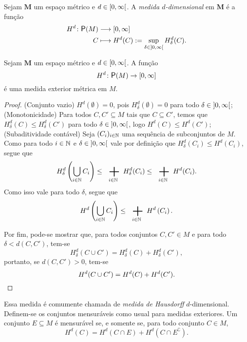 \begin{definition}
Sejam $\bm M$ um espaço métrico e $d \in \left[{0},{\infty}\right[$. A \emph{medida $d$-dimensional} em $\bm M$ é a função
 	\begin{align*}
 	\func{H^d}{\p(M)}{\intff{0}{\infty}}{C}{H^d(C) := \sup_{\delta \in \intaa{0}{\infty}} H^d_\delta(C).}
 	\end{align*}
\end{definition}

\begin{proposition}
Sejam $\bm M$ um espaço métrico e $d \in \left[{0},{\infty}\right[$. A função
	\begin{equation*}
	H^d\colon \p(M) \to \intff{0}{\infty}
	\end{equation*}
é uma medida exterior métrica em $M$.
\end{proposition}
\begin{proof}
(Conjunto vazio) $H^d(\emptyset)=0$, pois $H^d_\delta(\emptyset)=0$ para todo $\delta \in \left]{0},{\infty}\right[$; (Monotonicidade) Para todos $C,C' \subseteq M$ tais que $C \subseteq C'$, temos que $H^d_\delta(C) \leq H^d_\delta(C')$ para todo $\delta \in \left]{0},{\infty}\right[$, logo $H^d(C) \leq H^d(C')$; (Subaditividade contável) Seja $(C_i)_{i \in \mathbb{N}}$ uma sequência de subconjuntos de $M$. Como para todo $i \in \mathbb{N}$ e $\delta \in \left]{0},{\infty}\right[$ vale por definição que $H^d_\delta(C_i) \leq H^d(C_i)$, segue que
	\begin{equation*}
	H^d_\delta\left( \bigcup_{i \in \N} C_i \right) \leq \sum_{i \in \N} H^d_\delta(C_i) \leq  \sum_{i \in \N} H^d(C_i).
	\end{equation*}
Como isso vale para todo $\delta$, segue que
	\begin{equation*}
	H^d\left( \bigcup_{i \in \N} C_i \right) \leq \sum_{i \in \N} H^d\left( C_i \right).
	\end{equation*}

Por fim, pode-se mostrar que, para todos conjuntos $C,C' \in M$ e para todo $\delta < d(C,C')$, tem-se
	\begin{equation*}
	H^d_\delta(C \cup C') = H^d_\delta(C) + H^d_\delta(C'),
	\end{equation*}
portanto, se $d(C,C') > 0$, tem-se
	\begin{equation*}
	H^d(C \cup C') = H^d(C) + H^d(C'). \qedhere
	\end{equation*}
\end{proof}

Essa medida é comumente chamada de \emph{medida de Hausdorff} $d$-dimensional. Definem-se os conjuntos mensuráveis como usual para medidas exteriores. Um conjunto $E \subseteq M$ é mensurável se, e somente se, para todo conjunto $C \in M$,
	\begin{equation*}
	H^d(C) = H^d(C \cap E) + H^d(C \cap E^\complement).
	\end{equation*}

